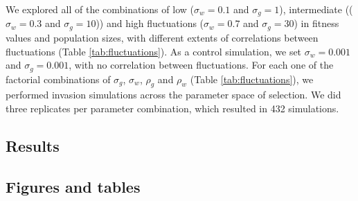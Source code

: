 \documentclass[12pt]{article}
\begin{document}
We explored all of  the combinations of low ($\sigma_{w} = 0.1$ and $\sigma_{g}=1$), intermediate (($\sigma_{w} =  0.3$ and $\sigma_{g}=10$)) and high fluctuations ($\sigma_{w} = 0.7$ and $\sigma_{g}=30$) in fitness values and population sizes, with different extents of correlations between fluctuations (Table \ref{tab:fluctuations}).  As a control simulation, we set $\sigma_{w}= 0.001$ and  $\sigma_{g}=0.001$, with no correlation between fluctuations. For each one of the factorial combinations of $\sigma_{g}$, $\sigma_{w}$, $\rho_{g}$ and $\rho_{w}$ (Table \ref{tab:fluctuations}), we performed invasion simulations across the parameter space of selection. We did three replicates per parameter combination, which resulted in 432 simulations.


\clearpage
\subsection*{Results}



\clearpage
\subsection*{Figures and tables }
\end{document}
